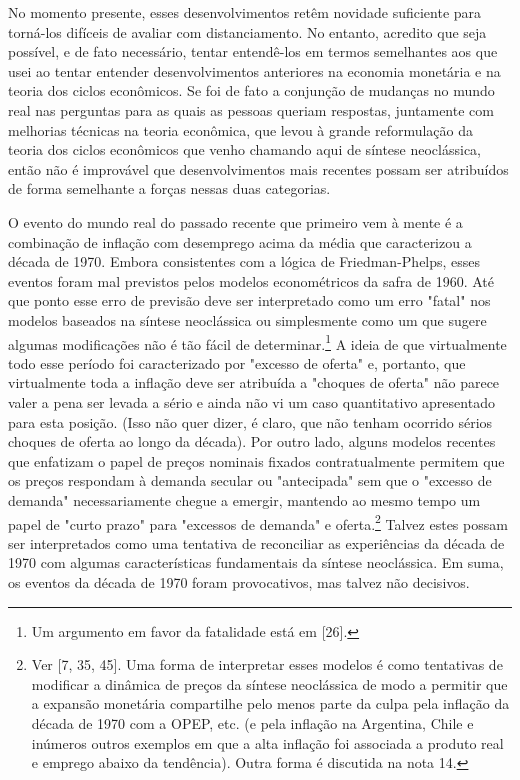 \documentclass[12pt]{article}
\begin{document}
No momento presente, esses desenvolvimentos retêm novidade suficiente para torná-los difíceis de avaliar com distanciamento. No entanto, acredito que seja possível, e de fato necessário, tentar entendê-los em termos semelhantes aos que usei ao tentar entender desenvolvimentos anteriores na economia monetária e na teoria dos ciclos econômicos. Se foi de fato a conjunção de mudanças no mundo real nas perguntas para as quais as pessoas queriam respostas, juntamente com melhorias técnicas na teoria econômica, que levou à grande reformulação da teoria dos ciclos econômicos que venho chamando aqui de síntese neoclássica, então não é improvável que desenvolvimentos mais recentes possam ser atribuídos de forma semelhante a forças nessas duas categorias.

O evento do mundo real do passado recente que primeiro vem à mente é a combinação de inflação com desemprego acima da média que caracterizou a década de 1970. Embora consistentes com a lógica de Friedman-Phelps, esses eventos foram mal previstos pelos modelos econométricos da safra de 1960. Até que ponto esse erro de previsão deve ser interpretado como um erro "fatal" nos modelos baseados na síntese neoclássica ou simplesmente como um que sugere algumas modificações não é tão fácil de determinar.\footnote{Um argumento em favor da fatalidade está em [26].} A ideia de que virtualmente todo esse período foi caracterizado por "excesso de oferta" e, portanto, que virtualmente toda a inflação deve ser atribuída a "choques de oferta" não parece valer a pena ser levada a sério e ainda não vi um caso quantitativo apresentado para esta posição. (Isso não quer dizer, é claro, que não tenham ocorrido sérios choques de oferta ao longo da década). Por outro lado, alguns modelos recentes que enfatizam o papel de preços nominais fixados contratualmente permitem que os preços respondam à demanda secular ou "antecipada" sem que o "excesso de demanda" necessariamente chegue a emergir, mantendo ao mesmo tempo um papel de "curto prazo" para "excessos de demanda" e oferta.\footnote{Ver [7, 35, 45]. Uma forma de interpretar esses modelos é como tentativas de modificar a dinâmica de preços da síntese neoclássica de modo a permitir que a expansão monetária compartilhe pelo menos parte da culpa pela inflação da década de 1970 com a OPEP, etc. (e pela inflação na Argentina, Chile e inúmeros outros exemplos em que a alta inflação foi associada a produto real e emprego abaixo da tendência). Outra forma é discutida na nota 14.} Talvez estes possam ser interpretados como uma tentativa de reconciliar as experiências da década de 1970 com algumas características fundamentais da síntese neoclássica. Em suma, os eventos da década de 1970 foram provocativos, mas talvez não decisivos.
\end{document}
